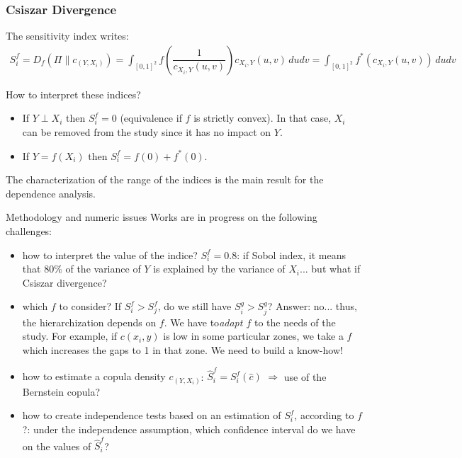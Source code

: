 \documentclass[8pt]{beamer}
\begin{document}
\begin{frame}
  \frametitle{Csiszar Divergence}
\small
The sensitivity index writes:
    \begin{align*}
      S_i^f= D_f(\Pi \| c_{(Y,X_i)}) = \int_{[0,1]^2}f\left(\dfrac{1}{c_{X_i,Y}(u,v)}\right)c_{X_i,Y}(u,v)\,dudv=\int_{[0,1]^2}f^*\left(c_{X_i,Y}(u,v)\right)\,dudv
    \end{align*}

  \begin{block}{How to interpret these indices?}
  \begin{itemize}
   \item \alert{If $Y \perp X_i$ then $S_i^f=0$}  (equivalence if $f$ is strictly convex). In that case, $X_i$ can be removed from the study since it has no impact on  $Y$.
   \item \alert{If $Y=f(X_i)$ then $S_i^f = f(0) + f^*(0)$}.
  \end{itemize}
The characterization of the range of the indices is the main result for the dependence analysis.
  \end{block}

  \begin{block}{Methodology and numeric issues}
   Works are in progress on the following challenges: 
    \begin{itemize}
    \item \alert{how to interpret the value of the indice?} $S_i^f=0.8$: if Sobol index, it means that $80\%$ of the variance of $Y$ is explained by the variance of $X_i$... but what if Csiszar divergence?
    \item \alert{which  $f$ to consider?} If $S_i^{f} > S_j^{f}$, do we still have $S_i^{g} > S_j^{g}$? Answer: no... thus, the hierarchization depends on $f$. We have to\emph{adapt $f$} to the needs of the study. For example, if $c(x_i, y)$ is low in some particular zones, we take a $f$ which increases the gaps to 1 in that zone. We need to build a know-how!
      \item \alert{how to estimate a copula density $c_{(Y,X_i)}$}:  $\hat{S}_i^f = S_i^f(\hat{c})$ $\Longrightarrow$ use of the Bernstein copula?
     \item \alert{how to create independence tests} based on an estimation of $S_i^f$, according to $f$?: under the independence assumption, which confidence interval do we have on the values of $\hat{S}_i^f$?
    \end{itemize}

  \end{block}

\end{frame}
\end{document}
